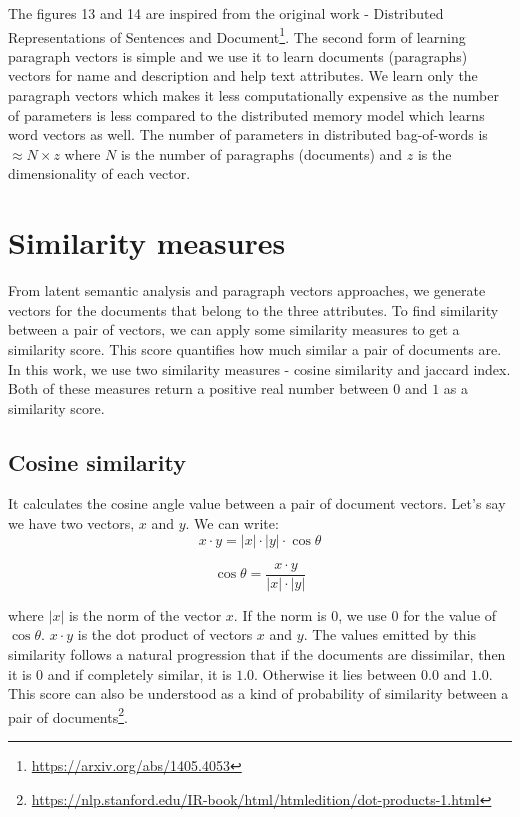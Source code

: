 The figures 13 and 14 are inspired from the original work - 
Distributed Representations of Sentences and Document\footnote{\label{pv}\url{https://arxiv.org/abs/1405.4053}}. The second form of learning paragraph vectors is simple and we use it to learn documents (paragraphs) vectors for name and description and help text attributes. We learn only the paragraph vectors which makes it less computationally expensive \cite{DBLP:journals/corr/LeM14} as the number of parameters is less compared to the distributed memory model which learns word vectors as well. The number of parameters in distributed bag-of-words is $\approx N \times z$ where $N$ is the number of paragraphs (documents) and $z$ is the dimensionality of each vector.

\section{Similarity measures}
From latent semantic analysis and paragraph vectors approaches, we generate vectors for the documents that belong to the three attributes. To find similarity between a pair of vectors, we can apply some similarity measures to get a similarity score. This score quantifies how much similar a pair of documents are. In this work, we use two similarity measures - cosine similarity and jaccard index. Both of these measures return a positive real number between $0$ and $1$ as a similarity score.

\subsection{Cosine similarity}
It calculates the cosine angle value between a pair of document vectors. Let's say we have two vectors, $x$ and $y$. We can write:
\begin{equation}
x \cdot y = |x| \cdot |y| \cdot \cos{\theta}
\end{equation}

\begin{equation}
\cos{\theta} = \frac {x \cdot y}{|x| \cdot |y|} 
\end{equation}

where $|x|$ is the norm of the vector $x$. If the norm is $0$, we use $0$ for the value of $\cos{\theta}$. $x \cdot y$ is the dot product of vectors $x$ and $y$. The values emitted by this similarity follows a natural progression that if the documents are dissimilar, then it is $0$ and if completely similar, it is $1.0$. Otherwise it lies between $0.0$ and $1.0$. This score can also be understood as a kind of probability of similarity between a pair of documents\footnote{\url{https://nlp.stanford.edu/IR-book/html/htmledition/dot-products-1.html}}.


